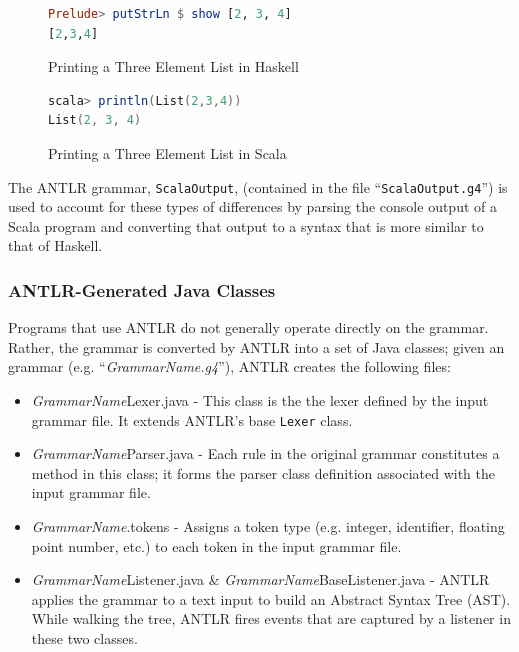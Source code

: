 \documentclass{report}
\begin{document}
\begin{figure}[H]
\begin{mdframed}
\begin{lstlisting}[language=Haskell]
Prelude> putStrLn $ show [2, 3, 4]
[2,3,4]
\end{lstlisting}
\end{mdframed}
\caption{Printing a Three Element List in Haskell}\label{fig:printListHaskell}
\end{figure}

\begin{figure}[H]
\begin{mdframed}
\begin{lstlisting}[language=Scala]
scala> println(List(2,3,4))
List(2, 3, 4)
\end{lstlisting}
\end{mdframed}
\caption{Printing a Three Element List in Scala}\label{fig:printListScala}
\end{figure}

The ANTLR grammar, \texttt{ScalaOutput}, (contained in the file ``\texttt{ScalaOutput.g4}'') is used to account for these types of differences by parsing the console output of a Scala program and converting that output to a syntax that is more similar to that of Haskell.

\subsubsection{ANTLR-Generated Java Classes}

Programs that use ANTLR do not generally operate directly on the grammar.  Rather, the grammar is converted by ANTLR into a set of Java classes; given an  grammar (e.g. ``\emph{GrammarName.g4}''),  ANTLR creates the following files:

\begin{itemize}
	\item \emph{GrammarName}Lexer.java - This class is the the lexer defined by the input grammar file.  It extends ANTLR's base \texttt{Lexer} class.
	
	\item \emph{GrammarName}Parser.java - Each rule in the original grammar constitutes a method in this class; it forms the parser class definition associated with the input grammar file.
	
	\item \emph{GrammarName}.tokens - Assigns a token type (e.g. integer, identifier, floating point number, etc.) to each token in the input grammar file.
	
	\item \emph{GrammarName}Listener.java \& \emph{GrammarName}BaseListener.java - ANTLR applies the grammar to a text input to build an Abstract Syntax Tree (AST).  While walking the tree, ANTLR fires events that are captured by a listener in these two classes\cite{antlrDefinitiveReference}.
	
\end{itemize}
\end{document}
